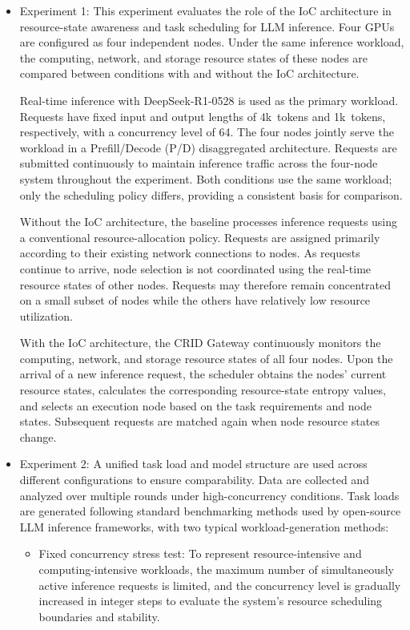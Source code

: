 \documentclass{ccjnl}
\begin{document}
\begin{itemize}[nosep]
\item Experiment 1:
This experiment evaluates the role of the IoC architecture in resource-state awareness and task scheduling for LLM inference. Four GPUs are configured as four independent nodes. Under the same inference workload, the computing, network, and storage resource states of these nodes are compared between conditions with and without the IoC architecture.

Real-time inference with DeepSeek-R1-0528 is used as the primary workload. Requests have fixed input and output lengths of 4k~tokens and 1k~tokens, respectively, with a concurrency level of 64. The four nodes jointly serve the workload in a Prefill/Decode (P/D) disaggregated architecture. Requests are submitted continuously to maintain inference traffic across the four-node system throughout the experiment. Both conditions use the same workload; only the scheduling policy differs, providing a consistent basis for comparison.

Without the IoC architecture, the baseline processes inference requests using a conventional resource-allocation policy. Requests are assigned primarily according to their existing network connections to nodes. As requests continue to arrive, node selection is not coordinated using the real-time resource states of other nodes. Requests may therefore remain concentrated on a small subset of nodes while the others have relatively low resource utilization.

With the IoC architecture, the CRID Gateway continuously monitors the computing, network, and storage resource states of all four nodes. Upon the arrival of a new inference request, the scheduler obtains the nodes' current resource states, calculates the corresponding resource-state entropy values, and selects an execution node based on the task requirements and node states. Subsequent requests are matched again when node resource states change.

\item Experiment 2: A unified task load and model structure are used across different configurations to ensure comparability. Data are collected and analyzed over multiple rounds under high-concurrency conditions. Task loads are generated following standard benchmarking methods used by open-source LLM inference frameworks, with two typical workload-generation methods:

\begin{itemize}[nosep]
	\item Fixed concurrency stress test: To represent resource-intensive and computing-intensive workloads, the maximum number of simultaneously active inference requests is limited, and the concurrency level is gradually increased in integer steps to evaluate the system's resource scheduling boundaries and stability.
	

\end{itemize}
\end{itemize}
\end{document}
